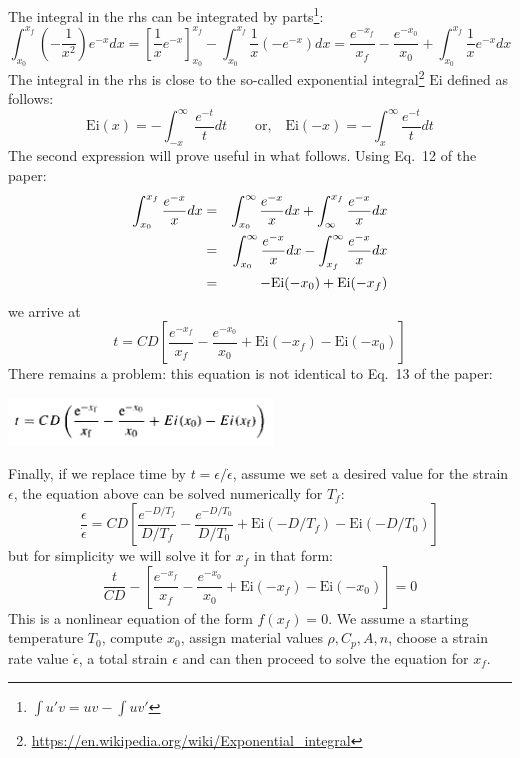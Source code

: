 The integral in the rhs can be integrated by parts\footnote{$\int u'v = uv - \int uv'$}:
\[
\int_{x_0}^{x_f} \left(-\frac{1}{x^2} \right) e^{-x} dx 
=  \left[\frac{1}{x} e^{-x} \right]_{x_0}^{x_f} - \int_{x_0}^{x_f} \frac{1}{x} (-e^{-x}) dx
= \frac{e^{-x_f}}{x_f}  - \frac{e^{-x_0}}{x_0}  +
\int_{x_0}^{x_f} \frac{1}{x} e^{-x} dx
\]
The integral in the rhs is close to the so-called 
exponential integral\footnote{\url{https://en.wikipedia.org/wiki/Exponential_integral}}
$\text{Ei}$ defined as follows:
\[
\text{Ei}(x)= - \int_{-x}^\infty \frac{e^{-t}}{t} dt 
\qquad \text{or,} \quad
\text{Ei}(-x)= -\int_{x}^\infty \frac{e^{-t}}{t} dt
\]
The second expression will prove useful in what follows.
Using Eq.~12 of the paper: 
\begin{eqnarray}
\int_{x_0}^{x_f} \frac{ e^{-x}}{x}  dx
&=& \int_{x_0}^\infty \frac{e^{-x}   }{x}  dx + \int^{x_f}_\infty \frac{e^{-x}}{x}  dx \nonumber\\
&=& \int_{x_0}^\infty \frac{e^{-x}   }{x}  dx - \int_{x_f}^\infty \frac{e^{-x}}{x}  dx \nonumber\\
&=& -\text{Ei}(-x_0) + \text{Ei}(-x_f)
\end{eqnarray}
we arrive at 
\[
\boxed{
t= CD \left[
\frac{e^{-x_f}}{x_f}  - \frac{e^{-x_0}}{x_0}  
+ \text{Ei}(-x_f) -\text{Ei}(-x_0) 
\right]
}
\]
There remains a problem: this equation is not identical to Eq.~13 
of the paper:
\begin{center}
\includegraphics[width=7cm]{python_codes/fieldstone_167/images/stuw98_eq}
\end{center}


Finally, if we replace time by $t=\epsilon / \dot\epsilon$, assume we set a 
desired value for the strain $\epsilon$, the equation above can be solved numerically for $T_f$:
\[
\frac{\epsilon}{\dot\epsilon} = 
CD
\left[
\frac{e^{-D/T_f}}{D/T_f}  - \frac{e^{-D/T_0}}{D/T_0}  
+ \text{Ei}(-D/T_f) -\text{Ei}(-D/T_0) 
\right]
\]
but for simplicity we will solve it for $x_f$ in that form:
\begin{equation}
\frac{t}{CD}
-
\left[
\frac{e^{-x_f}}{x_f}  - \frac{e^{-x_0}}{x_0}  
+ \text{Ei}(-x_f) -\text{Ei}(-x_0) 
\right]
=0
\label{f167:eqnl}
\end{equation}
This is a nonlinear equation of the form $f(x_f)=0$. We assume a starting temperature $T_0$, 
compute $x_0$, assign material values $\rho,C_p,A,n$, choose a strain rate value $\dot\epsilon$, 
a total strain $\epsilon$ and can then proceed to solve the equation for $x_f$.




